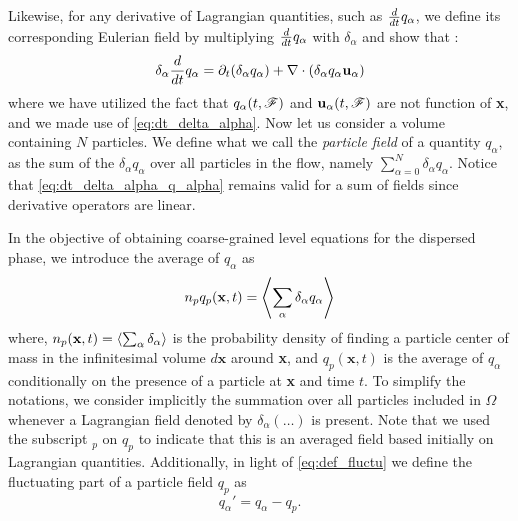 Likewise, for any derivative of Lagrangian quantities, such as $\frac{d}{dt} q_\alpha$, we define its corresponding Eulerian field by multiplying $\frac{d}{dt} q_\alpha$ with $\delta_\alpha$ and show that :
\begin{equation}
    \delta_\alpha \frac{d}{dt} q_\alpha
    = \partial_t (\delta_\alpha q_\alpha)
    + \mathbf{\nabla}\cdot (\delta_\alpha q_\alpha \textbf{u}_\alpha)
    \label{eq:dt_delta_alpha_q_alpha}
\end{equation}
where we have utilized the fact that $q_\alpha(t,\mathscr{F})$ and $\textbf{u}_\alpha(t,\mathscr{F})$ are not function of \textbf{x}, and we made use of \ref{eq:dt_delta_alpha}.
Now let us consider a volume containing $N$ particles.
We define what we call the \textit{particle field} of a quantity $q_\alpha$, as the sum of the $\delta_\alpha q_\alpha$ over all particles in the flow, namely $\sum_{\alpha=0}^N \delta_\alpha q_\alpha$.
Notice that \ref{eq:dt_delta_alpha_q_alpha} remains valid for a sum of fields since derivative operators are linear.

In the objective of obtaining coarse-grained level equations for the dispersed phase, we introduce the average of $q_\alpha$ as  
\begin{equation}
     n_p q_p(\textbf{x},t) = \left<\sum_\alpha\delta_\alpha q_\alpha\right>
     \label{eq:p_avg}
\end{equation}
where, $n_p(\textbf{x},t) = \left<\sum_\alpha \delta_\alpha\right>$ is the probability density of finding a particle center of mass in the infinitesimal volume $d\textbf{x}$ around \textbf{x}, and $q_p(\textbf{x},t)$ is the average of $q_\alpha$ conditionally on the presence of a particle at \textbf{x} and time $t$. 
To simplify the notations, we consider implicitly the summation over all particles included in $\Omega$ whenever a Lagrangian field denoted by $\delta_\alpha (\ldots)$ is present.
Note that we used the subscript $_p$ on $q_p$ to indicate that this is an averaged field based initially on Lagrangian quantities.  
Additionally, in light of \ref{eq:def_fluctu} we define the fluctuating part of a particle field $q_p$ as
\begin{equation}
    q_\alpha' = q_\alpha - q_p. 
    \label{eq:def_fluc_p}
\end{equation}

